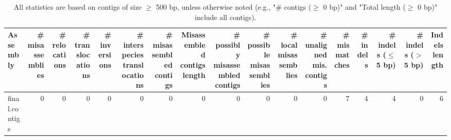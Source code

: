 \documentclass[12pt,a4paper]{article}
\begin{document}
\begin{table}[ht]
\begin{center}
\caption{All statistics are based on contigs of size $\geq$ 500 bp, unless otherwise noted (e.g., "\# contigs ($\geq$ 0 bp)" and "Total length ($\geq$ 0 bp)" include all contigs).}
\begin{tabular}{|l*{16}{|r}|}
\hline
Assembly & \# misassemblies &     \# relocations &     \# translocations &     \# inversions &     \# interspecies translocations & \# misassembled contigs & Misassembled contigs length & \# possibly misassembled contigs &     \# possible misassemblies & \# local misassemblies & \# unaligned mis. contigs & \# mismatches & \# indels &     \# indels ($\leq$ 5 bp) &     \# indels ($>$ 5 bp) & Indels length \\ \hline
final.contigs & 0 & 0 & 0 & 0 & 0 & 0 & 0 & 0 & 0 & 0 & 0 & 7 & 4 & 4 & 0 & 6 \\ \hline
\end{tabular}
\end{center}
\end{table}
\end{document}
